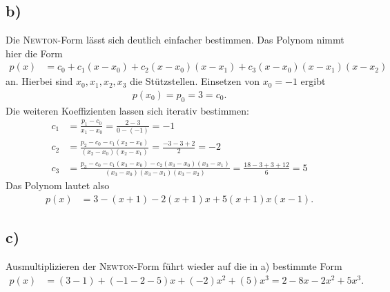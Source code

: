 \documentclass[english, parskip=full]{scrartcl}
\newcommand{\kla}{}
\begin{document}
\subsection*{b)}
Die \textsc{Newton}-Form lässt sich deutlich einfacher bestimmen.
Das Polynom nimmt hier die Form
\begin{align}
p(x)&=c_0+c_1(x-x_0)+c_2(x-x_0)(x-x_1)+c_3(x-x_0)(x-x_1)(x-x_2)
\end{align}
an.
Hierbei sind $x_0,x_1,x_2,x_3$ die Stützstellen.
Einsetzen von $x_0=-1$ ergibt
\begin{align}
p(x_0)=p_0=3=c_0.
\end{align}
Die weiteren Koeffizienten lassen sich iterativ bestimmen:
\begin{align}
c_1&=\frac{p_1-c_0}{x_1-x_0}=\frac{2-3}{0-(-1)}=-1\\
c_2&=\frac{p_2-c_0-c_1(x_2-x_0)}{(x_2-x_0)(x_2-x_1)}=\frac{-3-3+2}{2}=-2\\
c_3&=\frac{p_3-c_0-c_1(x_3-x_0)-c_2(x_3-x_0)(x_3-x_1)}{(x_3-x_0)(x_3-x_1)(x_3-x_2)}=\frac{18-3+3+12}{6}=5
\end{align}
Das Polynom lautet also
\begin{align}
p(x)&=3-(x+1)-2(x+1)x+5(x+1)x(x-1).
\end{align}
\subsection*{c)}
Ausmultiplizieren der \textsc{Newton}-Form führt wieder auf die in a) bestimmte Form
\begin{align}
p(x)&=\kla\left( 3-1 \right)+\kla\left( -1-2-5 \right)x+\kla\left( -2 \right)x^2+\kla\left( 5 \right)x^3=2-8x-2x^2+5x^3.
\end{align}
\newpage
\end{document}
